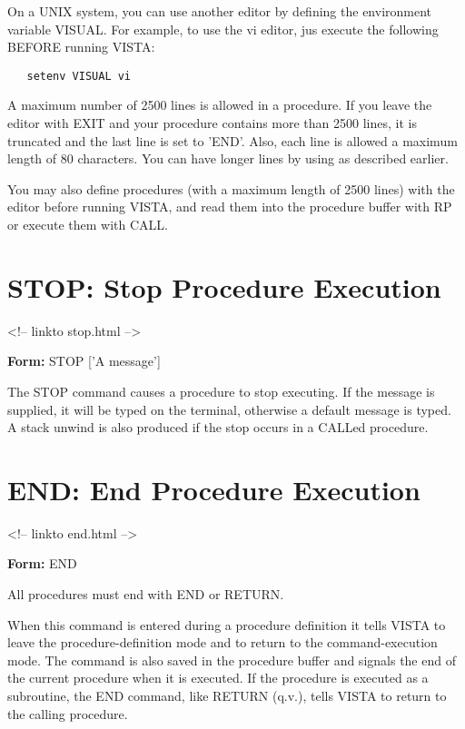 On a UNIX system, you can use another editor by defining the environment
variable VISUAL. For example, to use the vi editor, jus execute the
following BEFORE running VISTA:
\begin{verbatim}
   setenv VISUAL vi
\end{verbatim}
A maximum number of 2500 lines is allowed in a procedure.  If you leave the
editor with EXIT and your procedure contains more than 2500 lines, it is
truncated and the last line is set to 'END'.  Also, each line is allowed a
maximum length of 80 characters. You can have longer lines by using
 as described
earlier.

You may also define procedures (with a maximum length of 2500 lines) with
the editor before running VISTA, and read them into the procedure buffer
with RP or execute them with CALL.

\section{STOP: Stop Procedure Execution}
\begin{rawhtml}
<!-- linkto stop.html -->
\end{rawhtml}

\begin{command}
  \item[\textbf{Form: } STOP {['A message']}\hfill]{}
\end{command}
The STOP command causes a procedure to stop executing.  If the message is
supplied, it will be typed on the terminal, otherwise a default message is
typed.  A stack unwind is also produced if the stop occurs in a CALLed
procedure.

\section{END: End Procedure Execution}
\begin{rawhtml}
<!-- linkto end.html -->
\end{rawhtml}

\begin{command} 
  \item[\textbf{Form: } END\hfill]{}
\end{command}

All procedures must end with END or RETURN.

When this command is entered during a procedure definition it tells VISTA
to leave the procedure-definition mode and to return to the
command-execution mode.  The command is also saved in the procedure buffer
and signals the end of the current procedure when it is executed.  If the
procedure is executed as a subroutine, the END command, like RETURN (q.v.),
tells VISTA to return to the calling procedure.


